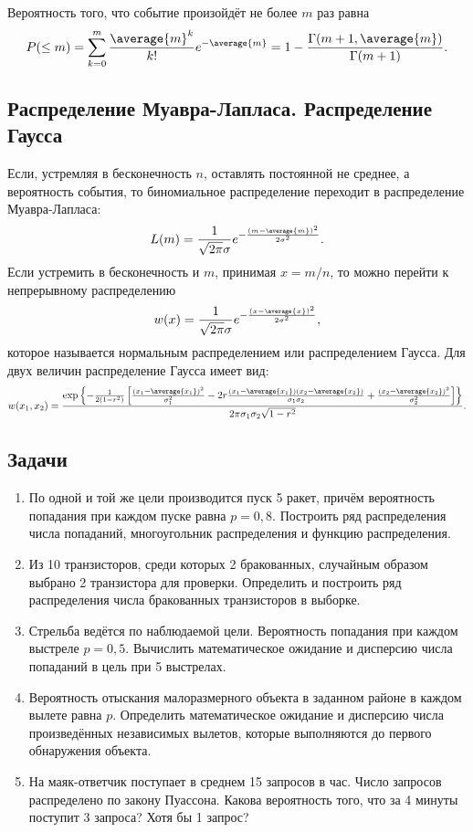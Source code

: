     Вероятность того, что событие произойдёт не более \( m \) раз равна
    \[
        P(\le m) = \sum_{k=0}^m \frac{\average{m}^k}{k!}e^{-\average{m}} =
        1 - \frac{\Gamma(m+1, \average{m})}{\Gamma(m+1)}.
    \]

\subsection{Распределение Муавра-Лапласа. Распределение Гаусса}
    Если, устремляя в бесконечность \( n \), оставлять постоянной не среднее, а
    вероятность события, то биномиальное распределение переходит в распределение
    Муавра-Лапласа:
    \[
        L(m) = \frac{1}{\sqrt{2\pi}\sigma}
            e^{-\frac{\left(m-\average{m}\right)^2}{2\sigma^2}}.
    \]
    Если устремить в бесконечность и \( m \), принимая \( x = m / n \), то можно
    перейти к непрерывному распределению
    \[
        w(x) = \frac{1}{\sqrt{2\pi}\sigma}
            e^{-\frac{\left(x-\average{x}\right)^2}{2\sigma^2}},
    \]
    которое называется нормальным распределением или распределением Гаусса.
    Для двух величин распределение Гаусса имеет вид:
    \[
        w(x_1, x_2) = \frac{
            \exp\left\{-\frac{1}{2(1-r^2)}\left[
                \frac{(x_1 - \average{x_1})^2}{\sigma_1^2} -
                2r\frac{(x_1 - \average{x_1})(x_2 - \average{x_2})}
                    {\sigma_1\sigma_2} +
                \frac{(x_2 - \average{x_2})^2}{\sigma_2^2}
            \right]\right\}
            }{2\pi\sigma_1\sigma_2\sqrt{1 - r^2}}.
    \]

\subsection{Задачи}
    \begin{enumerate}
        \item По одной и той же цели производится пуск 5 ракет, причём
            вероятность попадания при каждом пуске равна \( p = 0,8 \).
            Построить ряд распределения числа попаданий, многоугольник
            распределения и функцию распределения.
        \item Из 10 транзисторов, среди которых 2 бракованных, случайным образом
            выбрано 2 транзистора для проверки. Определить и построить ряд
            распределения числа бракованных транзисторов в выборке.
        \item Стрельба ведётся по наблюдаемой цели. Вероятность попадания при
            каждом выстреле \( p = 0,5 \). Вычислить математическое ожидание и
            дисперсию числа попаданий в цель при 5 выстрелах.
        \item Вероятность отыскания малоразмерного объекта в заданном районе в
            каждом вылете равна \( p \). Определить математическое ожидание и
            дисперсию числа произведённых независимых вылетов, которые
            выполняются до первого обнаружения объекта.
        \item На маяк-ответчик поступает в среднем 15 запросов в час. Число
            запросов распределено по закону Пуассона. Какова вероятность
            того, что за 4 минуты поступит 3 запроса? Хотя бы 1 запрос?
    \end{enumerate}
